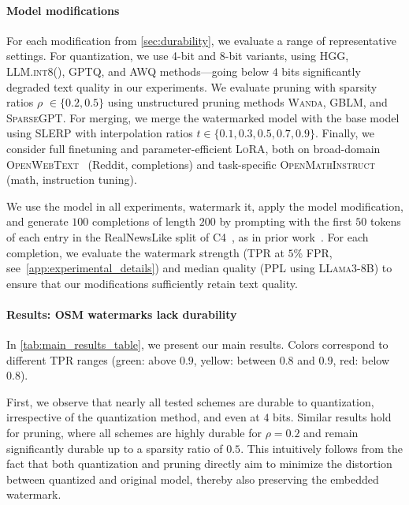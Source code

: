 \paragraph{Model modifications}
For each modification from \cref{sec:durability}, we evaluate a range of representative settings.
For quantization, we use 4-bit and 8-bit variants, using \textsc{HGG}, \textsc{LLM.int8()}, \textsc{GPTQ}, and \textsc{AWQ} methods---going below $4$ bits significantly degraded text quality in our experiments.
We evaluate pruning with sparsity ratios $\rho$ $\in \{0.2,0.5\}$ using unstructured pruning methods \textsc{Wanda}, \textsc{GBLM}, and \textsc{SparseGPT}. 
For merging, we merge the watermarked model with the base model using \textsc{SLERP} with interpolation ratios $t \in \{0.1,0.3,0.5,0.7,0.9\}$.
Finally, we consider full finetuning and parameter-efficient \textsc{LoRA}, both on broad-domain \textsc{OpenWebText}~\citep{openwebtext} (Reddit, completions) and task-specific \textsc{OpenMathInstruct}~\citep{openmathinstruct} (math, instruction tuning).

We use the \llama model in all experiments, watermark it, apply the model modification, and generate $100$ completions of length $200$ by prompting with the first $50$ tokens of each entry in the RealNewsLike split of C4~\citep{c4}, as in prior work~\citep{kgw}.  
For each completion, we evaluate the watermark strength (TPR at $5$\% FPR, see~\cref{app:experimental_details}) and median quality (PPL using \textsc{LLama3-8B}) to ensure that our modifications sufficiently retain text quality.
 
 
\paragraph{Results: OSM watermarks lack durability}
In \cref{tab:main_results_table}, we present our main results. 
Colors correspond to different TPR ranges (\textcolor{green!70!black}{green}: above $0.9$, \textcolor{yellow!70!black}{yellow}: between $0.8$ and $0.9$, \textcolor{red!70!black}{red}: below $0.8$).

First, we observe that nearly all tested schemes are durable to quantization, irrespective of the quantization method, and even at $4$ bits. 
Similar results hold for pruning, where all schemes are highly durable for $\rho=0.2$ and remain significantly durable up to a sparsity ratio of $0.5$. 
This intuitively follows from the fact that both quantization and pruning directly aim to minimize the distortion between quantized and original model, thereby also preserving the embedded watermark.

